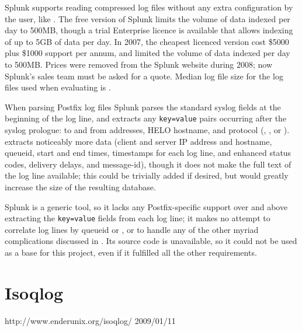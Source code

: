 Splunk supports reading compressed log files without any extra
configuration by the user, like \parsername{}.  The free version of Splunk
limits the volume of data indexed per day to 500MB, though a trial
Enterprise licence is available that allows indexing of up to 5GB of data
per day.  In 2007, the cheapest licenced version cost \$5000 plus \$1000
support per annum, and limited the volume of data indexed per day to
500MB\@.  Prices were removed from the Splunk website during 2008; now
Splunk's sales team must be asked for a quote.  Median log file size for
the log files used when evaluating \parsername{} is
.

When parsing Postfix log files Splunk parses the standard
syslog fields at the beginning of the log line, and extracts
any \texttt{key=value} pairs occurring after the syslog prologue: to and
from addresses, HELO hostname, and protocol (,
, or ).  \parsername{} extracts noticeably
more data (client and server IP address and hostname, queueid, start and
end times, timestamps for each log line,  and enhanced status
codes, delivery delays, and message-id), though it does not make the full
text of the log line available; this could be trivially added if desired,
but would greatly increase the size of the resulting database.

Splunk is a generic tool, so it lacks any Postfix-specific support over and
above extracting the \texttt{key=value} fields from each log line; it makes
no attempt to correlate log lines by queueid or , or to handle
any of the other myriad complications discussed in
.  Its source code is unavailable, so it could
not be used as a base for this project, even if it fulfilled all the other
requirements.

\section{Isoqlog}

{http://www.enderunix.org/isoqlog/}
{2009/01/11}

